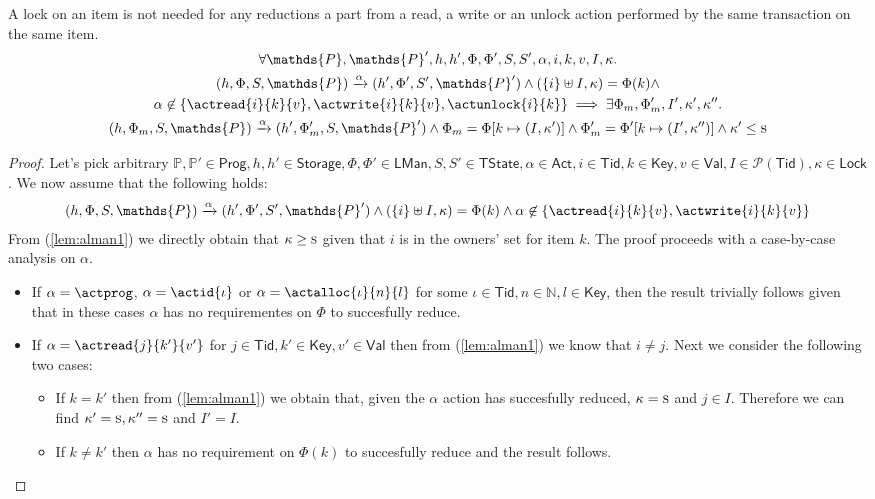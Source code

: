 \begin{lem}
	\label{lem:alman}
	A lock on an item is not needed for any reductions a part from a read, a write or an unlock action performed by the same transaction on the same item.
	\begin{gather*}
		\forall \mathds{P}, \mathds{P}', h, h', \Phi, \Phi', S, S', \alpha, i, k, v, I, \kappa \ldotp \\
		(h, \Phi, S, \mathds{P}) \xrightarrow{\alpha} (h', \Phi', S', \mathds{P}')
			\land
		(\{i\} \uplus I, \kappa) = \Phi(k)
			\land \\
		\alpha \not\in \{ \actread{i}{k}{v}, \actwrite{i}{k}{v}, \actunlock{i}{k} \}
			\implies
		\exists \Phi_m, \Phi_m', I', \kappa', \kappa'' \ldotp \\
		(h, \Phi_m, S, \mathds{P}) \xrightarrow{\alpha} (h', \Phi_m', S, \mathds{P}')
			\land
		\Phi_m = \Phi[k \mapsto (I, \kappa')]
			\land
		\Phi_m' = \Phi'[k \mapsto (I', \kappa'')]
			\land
		\kappa' \leq \textsc{s}
	\end{gather*}
	\begin{proof}
	Let's pick arbitrary $\mathds{P}, \mathds{P}' \in \mathsf{Prog}, h, h' \in \mathsf{Storage}, \Phi, \Phi' \in \mathsf{LMan}, S, S' \in \mathsf{TState}, \alpha \in \mathsf{Act}, i \in \mathsf{Tid}, k \in \mathsf{Key}, v \in \mathsf{Val}, I \in \mathcal{P}(\mathsf{Tid}), \kappa \in \mathsf{Lock}$. We now assume that the following holds:
	\begin{gather}
		\label{lem:alman1}
		(h, \Phi, S, \mathds{P}) \xrightarrow{\alpha} (h', \Phi', S', \mathds{P}')
			\land
		(\{i\} \uplus I, \kappa) = \Phi(k)
			\land
		\alpha \not\in \{ \actread{i}{k}{v}, \actwrite{i}{k}{v} \}
	\end{gather}
	From (\ref{lem:alman1}) we directly obtain that $\kappa \geq \textsc{s}$ given that $i$ is in the owners' set for item $k$. The proof proceeds with a case-by-case analysis on $\alpha$.
	\begin{itemize}
		\item If $\alpha = \actprog$, $\alpha = \actid{\iota}$ or $\alpha = \actalloc{\iota}{n}{l}$ for some $\iota \in \mathsf{Tid}, n \in \mathds{N}, l \in \mathsf{Key}$, then the result trivially follows given that in these cases $\alpha$ has no requirementes on $\Phi$ to succesfully reduce.
		
		\item If $\alpha = \actread{j}{k'}{v'}$ for $j \in \mathsf{Tid}, k' \in \mathsf{Key}, v' \in \mathsf{Val}$ then from (\ref{lem:alman1}) we know that $i \neq j$. Next we consider the following two cases:
			\begin{itemize}
				\item If $k = k'$ then from (\ref{lem:alman1}) we obtain that, given the $\alpha$ action has succesfully reduced, $\kappa = \textsc{s}$ and $j \in I$. Therefore we can find $\kappa' = \textsc{s}, \kappa'' = \textsc{s}$ and $I' = I$.
				\item If $k \neq k'$ then $\alpha$ has no requirement on $\Phi(k)$ to succesfully reduce and the result follows.
			\end{itemize}
			

\end{itemize}
\end{proof}
\end{lem}
